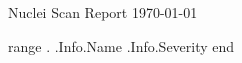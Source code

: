 \documentclass{article}
\begin{document}

\begin{titlepage}
\begin{center}
{\huge Nuclei Scan Report}
\vfill
\large{\today}

\end{center}
\end{titlepage}


{{range .}}
	{{.Info.Name}}
	{{.Info.Severity}}
{{end}}

\end{document}
